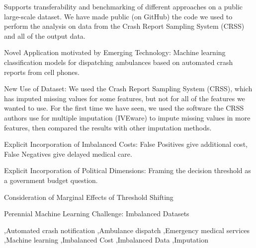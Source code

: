 \documentclass[fleqn]{cas-sc}
\begin{document}
\begin{graphicalabstract}



\end{graphicalabstract}

\begin{highlights}
	\item  Supports transferability and benchmarking of different approaches on a public large-scale dataset.  We have made public (on GitHub) the code we used to perform the analysis on data from the Crash Report Sampling System (CRSS) and all of the output data.  
	\item Novel Application motivated by Emerging Technology:  Machine learning classification models for dispatching ambulances based on automated crash reports from cell phones.  
	\item New Use of Dataset:  We used the Crash Report Sampling System (CRSS), which has imputed missing values for some features, but not for all of the features we wanted to use.  For the first time we have seen, we used the software the CRSS authors use for multiple imputation (IVEware) to impute missing values in more features, then compared the results with other imputation methods.
	\item Explicit Incorporation of Imbalanced Costs:  False Positives give additional cost, False Negatives give delayed medical care.
	\item Explicit Incorporation of Political Dimensions: Framing the decision threshold as a government budget question.
	\item Consideration of Marginal Effects of Threshold Shifting
	\item Perennial Machine Learning Challenge:  Imbalanced Datasets
\end{highlights}

\begin{keywords}
 \sep Automated crash notification 
 \sep Ambulance dispatch 
 \sep Emergency medical services  
 \sep Machine learning 
 \sep Imbalanced Cost 
 \sep Imbalanced Data 
 \sep Imputation
\end{keywords}

\maketitle

\end{document}
